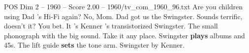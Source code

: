 \begin{textsample}{POS Dim 2 – 1960 – Score 2.00 – 1960/tv\_com\_1960\_96.txt}  \label{ex:f2_pos_027}
Are you children using Dad 's Hi-Fi again?
No, Mom.
Dad got us the Swingster.
Sounds terrific, doesn't it?
You bet.
It 's Kenner 's transistorized Swingster.
The small phonograph with the big sound.
Take it any place.
Swingster \textbf{plays} albums and 45s.
The lift guide \textbf{sets} the tone arm.
Swingster by Kenner.

\end{textsample}
